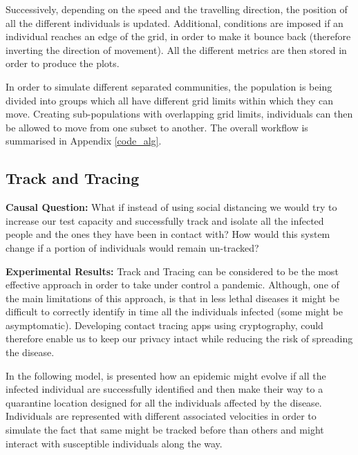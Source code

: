 Successively, depending on the speed and the travelling direction, the position of all the different individuals is updated. Additional, conditions are imposed if an individual reaches an edge of the grid, in order to make it bounce back (therefore inverting the direction of movement). All the different metrics are then stored in order to produce the plots.

In order to simulate different separated communities, the population is being divided into groups which all have different grid limits within which they can move. Creating sub-populations with overlapping grid limits, individuals can then be allowed to move from one subset to another. The overall workflow is summarised in Appendix \ref{code_alg}.

\subsection{Track and Tracing}

\textbf{Causal Question:} What if instead of using social distancing we would try to increase our test capacity and successfully track and isolate all the infected people and the ones they have been in contact with? How would this system change if a portion of individuals would remain un-tracked?

\textbf{Experimental Results:} Track and Tracing can be considered to be the most effective approach in order to take under control a pandemic. Although, one of the main limitations of this approach, is that in less lethal diseases it might be difficult to correctly identify in time all the individuals infected (some might be asymptomatic). Developing contact tracing apps using cryptography, could therefore enable us to keep our privacy intact while reducing the risk of spreading the disease.

In the following model, is presented how an epidemic might evolve if all the infected individual are successfully identified and then make their way to a quarantine location designed for all the individuals affected by the disease. Individuals are represented with different associated velocities in order to simulate the fact that same might be tracked before than others and might interact with susceptible individuals along the way.

